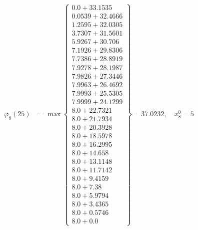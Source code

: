 \documentclass{article}
\begin{document}
\begin{align*}
  
\varphi_{8}(25) &= \max \left\{ \begin{array}{c}
0.0 + 33.1535 \\
 0.0539 + 32.4666 \\
 1.2595 + 32.0305 \\
 3.7307 + 31.5601 \\
 5.9267 + 30.706 \\
 7.1926 + 29.8306 \\
 7.7386 + 28.8919 \\
 7.9278 + 28.1987 \\
 7.9826 + 27.3446 \\
 7.9963 + 26.4692 \\
 7.9993 + 25.5305 \\
 7.9999 + 24.1299 \\
 8.0 + 22.7321 \\
 8.0 + 21.7934 \\
 8.0 + 20.3928 \\
 8.0 + 18.5978 \\
 8.0 + 16.2995 \\
 8.0 + 14.658 \\
 8.0 + 13.1148 \\
 8.0 + 11.7142 \\
 8.0 + 9.4159 \\
 8.0 + 7.38 \\
 8.0 + 5.9794 \\
 8.0 + 3.4365 \\
 8.0 + 0.5746 \\
 8.0 + 0.0
\end{array} \right\}=37.0232,\quad x_{8}^0=5\\
  
  
  

\end{align*}
\end{document}
